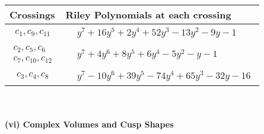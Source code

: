 \documentclass[1p]{elsarticle_modified}
\theoremstyle{definition}
\begin{document}
\begin{tabular}{m{50pt}|m{274pt}}
Crossings & \hspace{64pt}Riley Polynomials at each crossing \\
\hline $$\begin{aligned}c_{1},c_{9},c_{11}\end{aligned}$$&$\begin{aligned}
&y^7+16 y^5+2 y^4+52 y^3-13 y^2-9 y-1
\end{aligned}$\\
\hline $$\begin{aligned}c_{2},c_{5},c_{6}\\c_{7},c_{10},c_{12}\end{aligned}$$&$\begin{aligned}
&y^7+4 y^6+8 y^5+6 y^4-5 y^2- y-1
\end{aligned}$\\
\hline $$\begin{aligned}c_{3},c_{4},c_{8}\end{aligned}$$&$\begin{aligned}
&y^7-10 y^6+39 y^5-74 y^4+65 y^3-32 y-16
\end{aligned}$\\
\hline
\end{tabular}\\~\\
\newpage\flushleft \textbf{(vi) Complex Volumes and Cusp Shapes}
\end{document}
